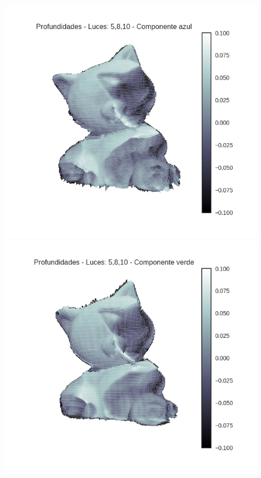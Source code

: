 \begin{figure}[H]
\centering
\begin{minipage}{.5\textwidth}
  \centering
  \includegraphics[width=1\linewidth]{informe/imagenes/profundidades/gato5810Azul.png}
\end{minipage}%
\begin{minipage}{.5\textwidth}
  \centering
    \includegraphics[width=1\linewidth]{informe/imagenes/profundidades/gato5810Verde.png}
\end{minipage}
\end{figure}

